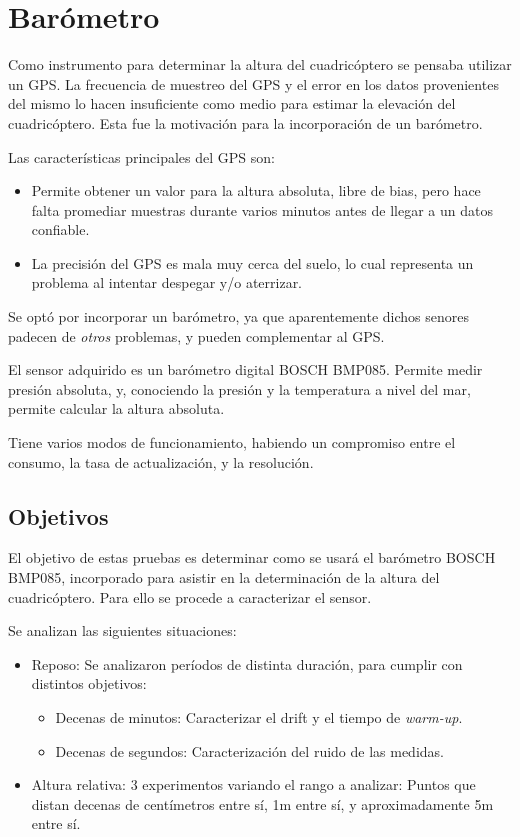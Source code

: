 \documentclass[spanish,12pt,a4paper,titlepage]{report}
\begin{document}
\chapter{Barómetro}
\label{chap:barometro}

Como instrumento para determinar la altura del cuadricóptero se pensaba utilizar un GPS. La frecuencia de muestreo del GPS y el error en los datos provenientes del mismo lo hacen insuficiente como medio para estimar la elevación del cuadricóptero. Esta fue la motivación para la incorporación de un barómetro.

Las características principales del GPS son:
\begin{itemize}
\item Permite obtener un valor para la altura absoluta, libre de bias, pero hace falta promediar muestras durante varios minutos antes de llegar a un datos confiable.
\item  La precisión del GPS es mala muy cerca del suelo, lo cual representa un problema al intentar despegar y/o aterrizar.
\end{itemize}

Se optó por incorporar un barómetro, ya que aparentemente dichos senores padecen de \textit{otros} problemas, y pueden complementar al GPS.

El sensor adquirido es un barómetro digital BOSCH BMP085. Permite medir presión absoluta, y, conociendo la presión y la temperatura a nivel del mar, permite calcular la altura absoluta.

Tiene varios modos de funcionamiento, habiendo un compromiso entre el consumo, la tasa de actualización, y la resolución.

\section{Objetivos}

El objetivo de estas pruebas es determinar como se usará el barómetro BOSCH BMP085, incorporado para asistir en la determinación de la altura del cuadricóptero. Para ello se procede a caracterizar el sensor.

Se analizan las siguientes situaciones:

\begin{itemize}
\item Reposo: Se analizaron períodos de distinta duración, para cumplir con distintos objetivos:
  \begin{itemize}
  \item Decenas de minutos: Caracterizar el drift y el tiempo de \textit{warm-up}.
  \item Decenas de segundos: Caracterización del ruido de las medidas.
  \end{itemize}
\item Altura relativa: 3 experimentos variando el rango a analizar: Puntos que distan decenas de centímetros entre sí, 1m entre sí, y aproximadamente 5m entre sí.
\end{itemize}
\end{document}

